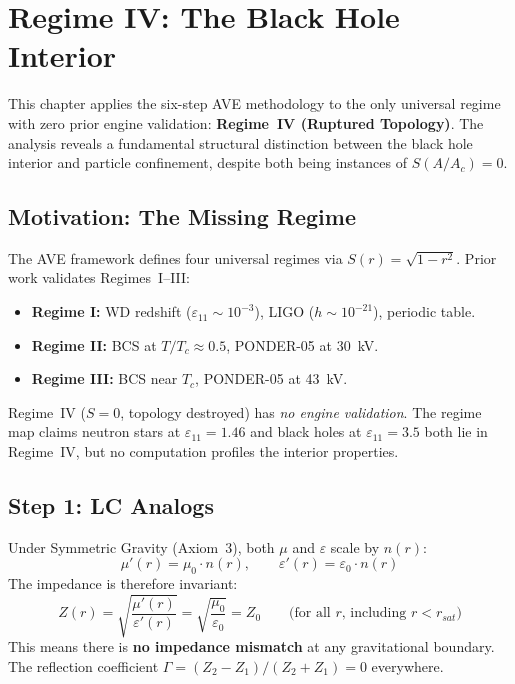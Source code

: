 \chapter{Regime IV: The Black Hole Interior}
\label{ch:bh_interior}

This chapter applies the six-step AVE methodology to the only universal regime
with zero prior engine validation: \textbf{Regime~IV (Ruptured Topology)}.
The analysis reveals a fundamental structural distinction between the
black hole interior and particle confinement, despite both being instances
of $S(A/A_c) = 0$.

\section{Motivation: The Missing Regime}

The AVE framework defines four universal regimes via $S(r) = \sqrt{1 - r^2}$.
Prior work validates Regimes~I--III:
\begin{itemize}
    \item \textbf{Regime I:} WD redshift ($\varepsilon_{11} \sim 10^{-3}$),
          LIGO ($h \sim 10^{-21}$), periodic table.
    \item \textbf{Regime II:} BCS at $T/T_c \approx 0.5$, PONDER-05 at 30~kV.
    \item \textbf{Regime III:} BCS near $T_c$, PONDER-05 at 43~kV.
\end{itemize}
Regime~IV ($S = 0$, topology destroyed) has \textit{no engine validation}.
The regime map claims neutron stars at $\varepsilon_{11} = 1.46$
and black holes at $\varepsilon_{11} = 3.5$ both lie in Regime~IV,
but no computation profiles the interior properties.

\section{Step 1: LC Analogs}

Under Symmetric Gravity (Axiom~3), both $\mu$ and $\varepsilon$ scale by $n(r)$:
\begin{equation}
    \mu'(r) = \mu_0 \cdot n(r), \qquad \varepsilon'(r) = \varepsilon_0 \cdot n(r)
\end{equation}
The impedance is therefore invariant:
\begin{equation}
    Z(r) = \sqrt{\frac{\mu'(r)}{\varepsilon'(r)}} = \sqrt{\frac{\mu_0}{\varepsilon_0}} = Z_0
    \qquad \text{(for all $r$, including $r < r_{sat}$)}
\end{equation}
This means there is \textbf{no impedance mismatch} at any gravitational boundary.
The reflection coefficient $\Gamma = (Z_2 - Z_1)/(Z_2 + Z_1) = 0$ everywhere.

